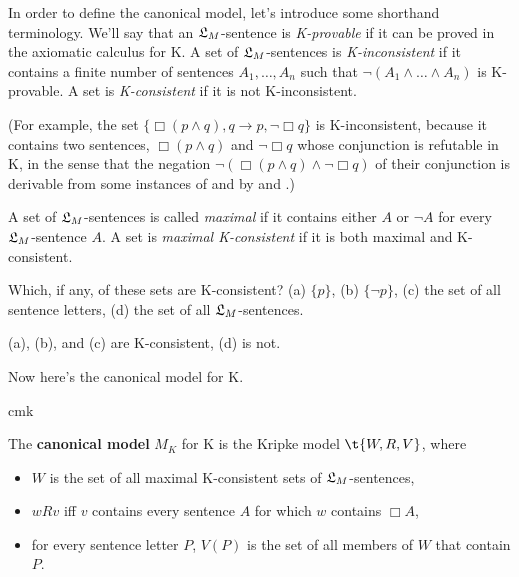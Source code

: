 In order to define the canonical model, let's introduce some shorthand
terminology. We'll say that an $\mathfrak{L}_M$-sentence is \emph{K-provable} if it can be
proved in the axiomatic calculus for K. A set of $\mathfrak{L}_M$-sentences is
\emph{K-inconsistent} if it contains a finite number of sentences
$A_1,\ldots,A_n$ such that $\neg (A_1 \land \ldots \land A_n)$ is K-provable. A
set is \emph{K-consistent} if it is not K-inconsistent.

(For example, the set $\{ \Box(p \land q), q \to p, \neg \Box q \}$ is
K-inconsistent, because it contains two sentences, $\Box(p \land q)$ and
$\neg \Box q$ whose conjunction is refutable in K, in the sense that the
negation $\neg(\Box(p \land q) \land \neg \Box q)$ of their conjunction is
derivable from some instances of  and  by  and .)

A set of $\mathfrak{L}_M$-sentences is called \emph{maximal} if it contains either $A$ or
$\neg A$ for every $\mathfrak{L}_M$-sentence $A$. A set is \emph{maximal K-consistent} if
it is both maximal and K-consistent.


\begin{exercise}
  Which, if any, of these sets are K-consistent? (a) $\{ p \}$, (b)
  $\{ \neg p \}$, (c) the set of all sentence letters, (d) the set of all
  $\mathfrak{L}_{M}$-sentences.
\end{exercise}
\begin{solution}
  (a), (b), and (c) are K-consistent, (d) is not.
\end{solution}


Now here's the canonical model for K.

\begin{definition}{}{cmk}
  
  The \textbf{canonical model} $M_K$ for K is the Kripke model $\t{W,R,V}$, where%
  \vspace{-2mm}
  \begin{itemize}[leftmargin=7mm]
    \itemsep-1mm
    \item $W$ is the set of all maximal K-consistent sets of $\mathfrak{L}_M$-sentences,
    \item $wRv$ iff $v$ contains every sentence $A$ for which $w$ contains
          $\Box A$,
    \item for every sentence letter $P$, $V(P)$ is the set of all members of $W$
          that contain $P$.
  \end{itemize}
\end{definition}

